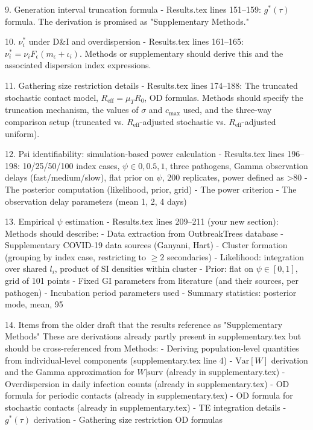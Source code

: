   9. Generation interval truncation formula
  - Results.tex lines 151–159: $g^*(\tau)$ formula. The derivation is promised as "Supplementary
  Methods."

  10. $\nu_i^*$ under D&I and overdispersion
  - Results.tex lines 161–165: $\nu_i^* = \nu_i F_\epsilon(m_\epsilon + \iota_i)$. Methods or
  supplementary should derive this and the associated dispersion index expressions.

  11. Gathering size restriction details
  - Results.tex lines 174–188: The truncated stochastic contact model, $R_\text{eff} = \mu_T R_0$, OD
   formulas. Methods should specify the truncation mechanism, the values of $\sigma$ and
  $c_\text{max}$ used, and the three-way comparison setup (truncated vs. $R_\text{eff}$-adjusted
  stochastic vs. $R_\text{eff}$-adjusted uniform).

  12. Psi identifiability: simulation-based power calculation
  - Results.tex lines 196–198: 10/25/50/100 index cases, $\psi \in {0, 0.5, 1}$, three pathogens,
  Gamma observation delays (fast/medium/slow), flat prior on $\psi$, 200 replicates, power defined as
   >80%
    - The posterior computation (likelihood, prior, grid)
    - The power criterion
    - The observation delay parameters (mean 1, 2, 4 days)

  13. Empirical $\psi$ estimation
  - Results.tex lines 209–211 (your new section): Methods should describe:
    - Data extraction from OutbreakTrees database
    - Supplementary COVID-19 data sources (Ganyani, Hart)
    - Cluster formation (grouping by index case, restricting to $\geq 2$ secondaries)
    - Likelihood: integration over shared $l_i$, product of SI densities within cluster
    - Prior: flat on $\psi \in [0, 1]$, grid of 101 points
    - Fixed GI parameters from literature (and their sources, per pathogen)
    - Incubation period parameters used
    - Summary statistics: posterior mode, mean, 95%

  14. Items from the older draft that the results reference as "Supplementary Methods"
  These are derivations already partly present in supplementary.tex but should be cross-referenced
  from Methods:
  - Deriving population-level quantities from individual-level components (supplementary.tex line 4)
  - $\text{Var}[W]$ derivation and the Gamma approximation for $W|\text{surv}$ (already in
  supplementary.tex)
  - Overdispersion in daily infection counts (already in supplementary.tex)
  - OD formula for periodic contacts (already in supplementary.tex)
  - OD formula for stochastic contacts (already in supplementary.tex)
  - TE integration details
  - $g^*(\tau)$ derivation
  - Gathering size restriction OD formulas

